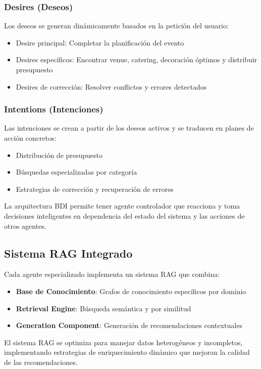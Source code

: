 \documentclass[runningheads,a4paper]{llncs}
\begin{document}
\subsubsection{Desires (Deseos)}
Los deseos se generan dinámicamente basados en la petición del usuario:
\begin{itemize}
    \item Desire principal: Completar la planificación del evento
    \item Desires específicos: Encontrar venue, catering, decoración óptimos y distribuir presupuesto
    \item Desires de corrección: Resolver conflictos y errores detectados
\end{itemize}

\subsubsection{Intentions (Intenciones)}
Las intenciones se crean a partir de los deseos activos y se traducen en planes de acción concretos:
\begin{itemize}
    \item Distribución de presupuesto
    \item Búsquedas especializadas por categoría
    \item Estrategias de corrección y recuperación de errores
\end{itemize}

La arquitectura BDI permite tener agente controlador que reacciona y toma decisiones inteligentes en dependencia del estado del sistema y las acciones de otros agentes.

\subsection{Sistema RAG Integrado}

Cada agente especializado implementa un sistema RAG que combina:

\begin{itemize}
    \item \textbf{Base de Conocimiento}: Grafos de conocimiento específicos por dominio
    \item \textbf{Retrieval Engine}: Búsqueda semántica y por similitud
    \item \textbf{Generation Component}: Generación de recomendaciones contextuales
\end{itemize}

El sistema RAG se optimiza para manejar datos heterogéneos y incompletos, implementando estrategias de enriquecimiento dinámico que mejoran la calidad de las recomendaciones.
\end{document}
